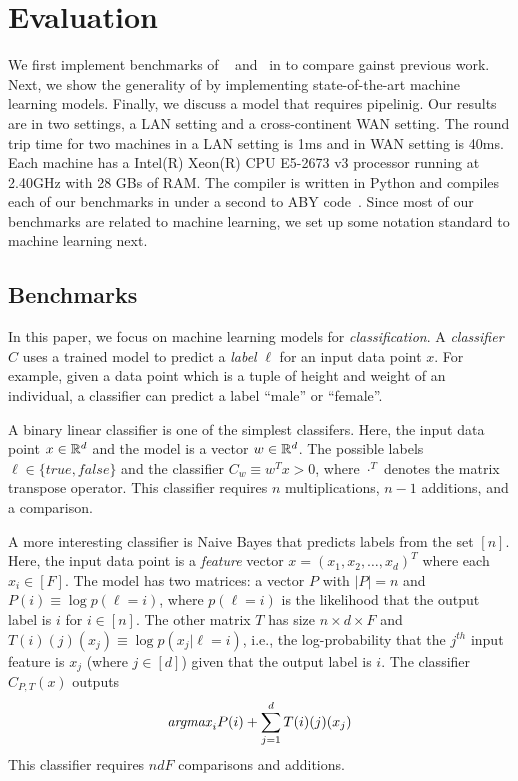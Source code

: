 \section{Evaluation}
\label{sec:eval}

We first implement benchmarks of ~\cite{shafindss} and~\cite{minionn} in \tool to compare gainst 
previous work.
Next, we show the generality of \tool by implementing state-of-the-art machine learning models.
Finally, we discuss a model that requires pipelinig.
Our results are in two settings, a LAN setting and a cross-continent WAN setting.
The round trip time for two machines in a LAN setting is 1ms and in WAN setting is 40ms.
Each machine has a Intel(R) Xeon(R) CPU E5-2673 v3 processor running at 2.40GHz with
28 GBs of RAM. The \tool compiler is written in Python and compiles each of our benchmarks
in under a second to ABY code~\cite{aby}. Since most of our benchmarks are related to machine learning, we set up some notation standard to machine learning next. 

\subsection{Benchmarks}
In this paper, we focus on machine learning models for {\it classification}.
A {\it classifier} $C$ uses a trained model to predict a {\it label} $\ell$ for an input data point $x$. For example, given a data point which is a tuple of height and weight of an individual,
a classifier can predict a label ``male'' or ``female''.

A binary linear classifier is one of the simplest classifers. Here, the input data point $x\in{\mathbb{R}}^d$
and the model is a vector $w\in{\mathbb{R}}^d$. The possible labels $\ell\in\{\mathit{true},\mathit{false}\}$
and the classifier $C_w\equiv w^Tx>0$, where $\cdot^T$ denotes the matrix transpose operator.
This classifier requires $n$ multiplications, $n-1$ additions, and a comparison.

A more interesting classifier is Naive Bayes that predicts labels from the set $[n]$.
Here, the input data point is a {\it feature}
vector $x=(x_1,x_2,\ldots,x_d)^T$ where each $x_i\in [F]$.
The model has two matrices: a vector $P$ with $|P|=n$ and $P(i) \equiv \log p(\ell=i)$, where $p(\ell=i)$ is the likelihood that the output label is $i$ for $i\in[n]$.
The other matrix $T$ has size $n\times d\times F$ and $T(i)(j)(x_j)\equiv\log p(x_j|\ell=i)$, i.e., the log-probability that 
the $j^{th}$ input feature is $x_j$ (where $j\in [d]$) given that the output label is $i$.
The classifier $C_{P,T}(x)$ outputs
\[
{\it argmax}_i P(i)+\sum_{j=1}^d T(i)(j)(x_j)
\]
This classifier requires $ndF$ comparisons and additions.

